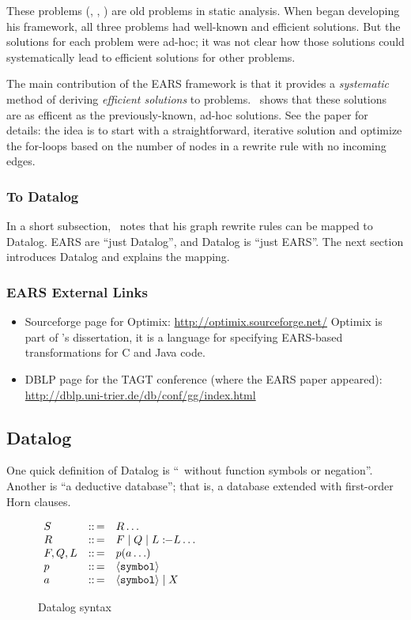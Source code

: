 \documentclass{article}
\begin{document}
These problems ({\bb}, {\rd}, {\eq}) are old problems in static analysis.
When \assmann{} began developing his framework, all three problems had well-known and efficient solutions.
But the solutions for each problem were ad-hoc; it was not clear how those solutions could systematically lead to efficient solutions for other problems.

The main contribution of the EARS framework is that it provides a \emph{systematic} method of deriving \emph{efficient solutions} to problems.
\assmann\ shows that these solutions are as efficent as the previously-known, ad-hoc solutions.
See the paper for details: the idea is to start with a straightforward, iterative solution and optimize the for-loops based on the number of nodes in a rewrite rule with no incoming edges.


\subsubsection*{To Datalog}

In a short subsection, \assmann\ notes that his graph rewrite rules can be mapped to Datalog.
EARS are ``just Datalog'', and Datalog is ``just EARS''.
The next section introduces Datalog and explains the mapping.


\subsubsection*{EARS External Links}
\begin{itemize}
\item Sourceforge page for Optimix: \url{http://optimix.sourceforge.net/}
  Optimix is part of \assmann{}'s dissertation, it is a language for specifying EARS-based transformations for C and Java code.
\item DBLP page for the TAGT conference (where the EARS paper appeared): \url{http://dblp.uni-trier.de/db/conf/gg/index.html}
\end{itemize}


\subsection*{Datalog}

One quick definition of Datalog is ``\prolog\ without function symbols or negation''.
Another is ``a deductive database''; that is, a database extended with first-order Horn clauses.

\begin{figure}[t]
  \begin{center}$\begin{array}{l l l}
    S & ::\,= & R \ldots
    \\
    R & ::\,= & F \mid Q \mid L :\!\!- L \ldots
    \\
    F,Q,L & ::\,= & p(a\ldots)
    \\
    p & ::\,= & \langle {\tt symbol} \rangle
    \\
    a & ::\,= & \langle {\tt symbol} \rangle \mid X
  \end{array}$\end{center}
  \caption{Datalog syntax}
  \label{fig:datalog-syntax}
\end{figure}
\end{document}
